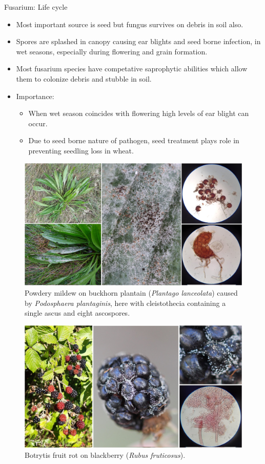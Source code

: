 \documentclass[10pt,dvipsnames,ignorenonframetext,aspectratio=169]{beamer}
\providecommand{\tightlist}{%
  \setlength{\itemsep}{0pt}\setlength{\parskip}{0pt}}
\begin{document}
\begin{frame}{Fusarium: Life cycle}
\protect\hypertarget{fusarium-life-cycle}{}
\begin{itemize}
\tightlist
\item
  Most important source is seed but fungus survives on debris in soil
  also.
\item
  Spores are splashed in canopy causing ear blights and seed borne
  infection, in wet seasons, especially during flowering and grain
  formation.
\item
  Most fusarium species have competative saprophytic abilities which
  allow them to colonize debris and stubble in soil.
\item
  Importance:

  \begin{itemize}
  \tightlist
  \item
    When wet season coincides with flowering high levels of ear blight
    can occur.
  \item
    Due to seed borne nature of pathogen, seed treatment plays role in
    preventing seedling loss in wheat.
  \end{itemize}
\end{itemize}
\end{frame}

\begin{frame}{}
\protect\hypertarget{section-14}{}
\begin{figure}
\includegraphics[width=0.38\linewidth]{../images/plantain_podosphaera_plantaginis_powdery_mildew} \caption{Powdery mildew on buckhorn plantain (\textit{Plantago lanceolata}) caused by \textit{Podosphaera plantaginis}, here with cleistothecia containing a single ascus and eight ascospores.}\label{fig:plantain-powdery-mildew}
\end{figure}

\begin{figure}
\includegraphics[width=0.38\linewidth]{../images/blackberry_botrytis_rot} \caption{Botrytis fruit rot on blackberry (\textit{Rubus fruticosus}).}\label{fig:blackberry-botrytis-rot}
\end{figure}
\end{frame}
\end{document}

